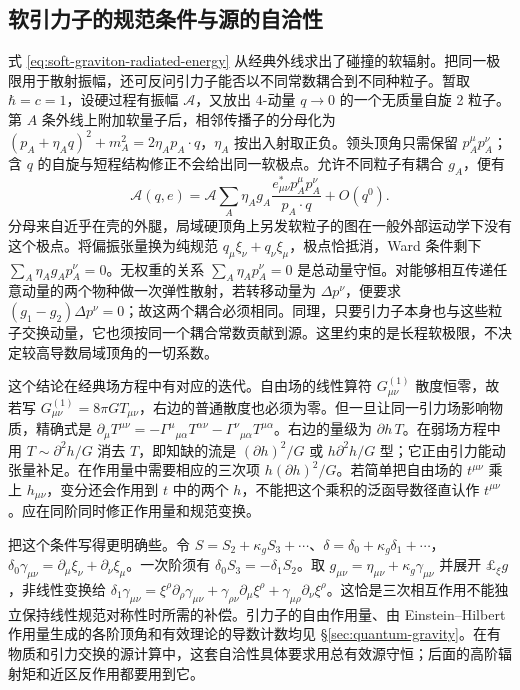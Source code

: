\subsection{软引力子的规范条件与源的自洽性}

式 \eqref{eq:soft-graviton-radiated-energy} 从经典外线求出了碰撞的软辐射。把同一极限用于散射振幅，还可反问引力子能否以不同常数耦合到不同种粒子。暂取 $\hbar=c=1$，设硬过程有振幅 $\mathcal A$，又放出 4-动量 $q\to0$ 的一个无质量自旋 2 粒子。第 $A$ 条外线上附加软量子后，相邻传播子的分母化为 $(p_A+\eta_A q)^2+m_A^2=2\eta_A p_A\cdot q$，$\eta_A$ 按出入射取正负。领头顶角只需保留 $p_A^\mu p_A^\nu$；含 $q$ 的自旋与短程结构修正不会给出同一软极点。允许不同粒子有耦合 $g_A$，便有
\[
 \mathcal A(q,e)
  =\mathcal A \sum_A\eta_A g_A
      \frac{e_{\mu\nu}^*p_A^\mu p_A^\nu}{p_A\cdot q}+O(q^0).
\]
分母来自近乎在壳的外腿，局域硬顶角上另发软粒子的图在一般外部运动学下没有这个极点。将偏振张量换为纯规范 $q_\mu\xi_\nu+q_\nu\xi_\mu$，极点恰抵消，Ward 条件剩下 $\sum_A\eta_Ag_A p_A^\nu=0$。无权重的关系 $\sum_A\eta_Ap_A^\nu=0$ 是总动量守恒。对能够相互传递任意动量的两个物种做一次弹性散射，若转移动量为 $\Delta p^\nu$，便要求 $(g_1-g_2)\Delta p^\nu=0$；故这两个耦合必须相同。同理，只要引力子本身也与这些粒子交换动量，它也须按同一个耦合常数贡献到源。这里约束的是长程软极限，不决定较高导数局域顶角的一切系数。

这个结论在经典场方程中有对应的迭代。自由场的线性算符 $G_{\mu\nu}^{(1)}$ 散度恒零，故若写 $G_{\mu\nu}^{(1)}=8\pi G T_{\mu\nu}$，右边的普通散度也必须为零。但一旦让同一引力场影响物质，精确式是 $\partial_\mu T^{\mu\nu}=-\Gamma^\mu{}_{\mu\alpha}T^{\alpha\nu}-\Gamma^\nu{}_{\mu\alpha}T^{\mu\alpha}$。右边的量级为 $\partial h\,T$。在弱场方程中用 $T\sim\partial^2h/G$ 消去 $T$，即知缺的流是 $(\partial h)^2/G$ 或 $h\partial^2h/G$ 型；它正由引力能动张量补足。在作用量中需要相应的三次项 $h(\partial h)^2/G$。若简单把自由场的 $t^{\mu\nu}$ 乘上 $h_{\mu\nu}$，变分还会作用到 $t$ 中的两个 $h$，不能把这个乘积的泛函导数径直认作 $t^{\mu\nu}$。应在同阶同时修正作用量和规范变换。

把这个条件写得更明确些。令 $S=S_2+\kappa_g S_3+\cdots$、$\delta=\delta_0+\kappa_g\delta_1+\cdots$，$\delta_0\gamma_{\mu\nu}=\partial_\mu\xi_\nu+\partial_\nu\xi_\mu$。一次阶须有 $\delta_0 S_3=-\delta_1 S_2$。取 $g_{\mu\nu}=\eta_{\mu\nu}+\kappa_g\gamma_{\mu\nu}$ 并展开 $\pounds_\xi g$，非线性变换给 $\delta_1\gamma_{\mu\nu}=\xi^\rho\partial_\rho\gamma_{\mu\nu}+\gamma_{\rho\nu}\partial_\mu\xi^\rho+\gamma_{\mu\rho}\partial_\nu\xi^\rho$。这恰是三次相互作用不能独立保持线性规范对称性时所需的补偿。引力子的自由作用量、由 Einstein--Hilbert 作用量生成的各阶顶角和有效理论的导数计数均见 \S\ref{sec:quantum-gravity}。在有物质和引力交换的源计算中，这套自洽性具体要求用总有效源守恒；后面的高阶辐射矩和近区反作用都要用到它。

